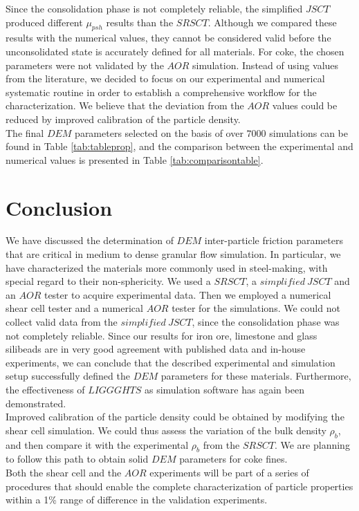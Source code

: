 \documentclass{CFD2015}
\begin{document}
Since the consolidation phase is not completely reliable, the simplified $JSCT$ produced different $\mu_{psh}$ results than the $SRSCT$. Although we compared these results with the numerical values, they cannot be considered valid before the unconsolidated state is accurately defined for all materials.
For coke, the chosen parameters were not validated by the $AOR$ simulation. 
Instead of using values from the literature, we decided to focus on our experimental and numerical systematic routine in order to establish a comprehensive workflow for the characterization.
We believe that the deviation from the $AOR$ values could be reduced by improved calibration of the particle density. \\
The final $DEM$ parameters selected on the basis of over $7000$ simulations can be found in Table \ref{tab:tableprop}, and the comparison between the experimental and numerical values is presented in Table \ref{tab:comparisontable}.

\section{Conclusion}
We have discussed the determination of $DEM$ inter-particle friction parameters that are critical in medium to dense granular flow simulation.
In particular, we have characterized the materials more commonly used in steel-making, with special regard to their non-sphericity.
We used a $SRSCT$, a $simplified ~ JSCT$ and an $AOR$ tester to acquire experimental data. Then we employed a numerical shear cell tester and a numerical $AOR$ tester for the simulations.
We could not collect valid data from the $simplified ~ JSCT$, since the consolidation phase was not completely reliable.
Since our results for iron ore, limestone and glass silibeads are in very good agreement with published data and in-house experiments, we can conclude that the described experimental and simulation setup successfully defined the $DEM$ parameters for these materials. 
Furthermore, the effectiveness of $LIGGGHTS$ as simulation software has again been demonstrated.\\
Improved calibration of the particle density could be obtained by modifying the shear cell simulation. 
We could thus assess the variation of the bulk density $\rho_b$, and then compare it with the experimental $\rho_b$ from the $SRSCT$.
We are planning to follow this path to obtain solid $DEM$ parameters for coke fines.\\
Both the shear cell and the $AOR$ experiments will be part of a series of procedures that should enable the complete characterization of particle properties within a 1\% range of difference in the validation experiments.\\
\end{document}
